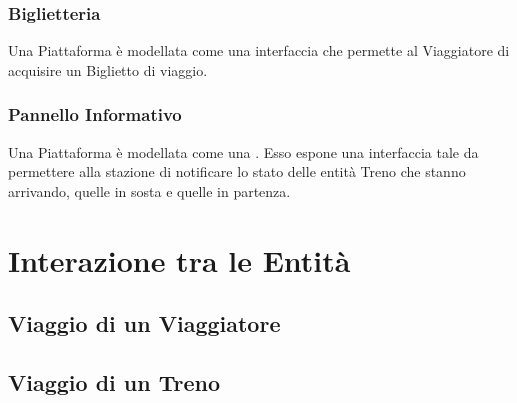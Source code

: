 		\subsubsection{Biglietteria}
		
		Una Piattaforma è modellata come una interfaccia che permette al Viaggiatore di acquisire un Biglietto di viaggio. 
		
		\subsubsection{Pannello Informativo}
		
		Una Piattaforma è modellata come una . Esso espone una interfaccia tale da permettere alla stazione di notificare lo stato delle entità Treno che stanno arrivando, quelle in sosta e quelle in partenza.

\section{Interazione tra le Entità}

	\subsection{Viaggio di un Viaggiatore}
	
	\subsection{Viaggio di un Treno}
	
	
	

